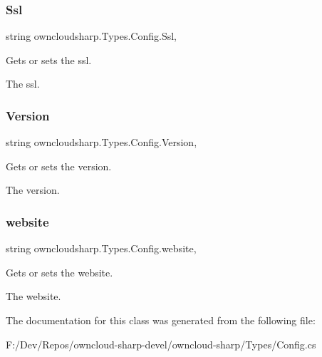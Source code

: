 \subsubsection{\texorpdfstring{Ssl}{Ssl}}
{\footnotesize\ttfamily string owncloudsharp.\+Types.\+Config.\+Ssl\hspace{0.3cm}{\ttfamily [get]}, {\ttfamily [set]}}



Gets or sets the ssl. 

The ssl.\mbox{\label{classowncloudsharp_1_1_types_1_1_config_af3fae6f952897261eeb927f2e0cae79f}} 
\subsubsection{\texorpdfstring{Version}{Version}}
{\footnotesize\ttfamily string owncloudsharp.\+Types.\+Config.\+Version\hspace{0.3cm}{\ttfamily [get]}, {\ttfamily [set]}}



Gets or sets the version. 

The version.\mbox{\label{classowncloudsharp_1_1_types_1_1_config_affdfbcb88e5cead0f1f4e693a2fc61b3}} 
\subsubsection{\texorpdfstring{website}{website}}
{\footnotesize\ttfamily string owncloudsharp.\+Types.\+Config.\+website\hspace{0.3cm}{\ttfamily [get]}, {\ttfamily [set]}}



Gets or sets the website. 

The website.

The documentation for this class was generated from the following file\+:\begin{DoxyCompactItemize}
\item 
F\+:/\+Dev/\+Repos/owncloud-\/sharp-\/devel/owncloud-\/sharp/\+Types/Config.\+cs\end{DoxyCompactItemize}
